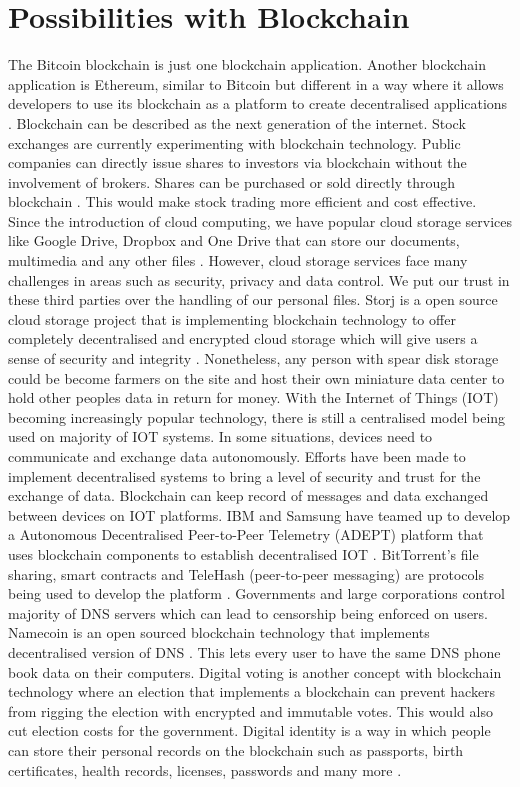 \documentclass[report]{IEEEtran}
\begin{document}
\section{Possibilities with Blockchain}
The Bitcoin blockchain is just one blockchain application. Another blockchain application is Ethereum, similar to Bitcoin but different in a way where it allows developers to use its blockchain as a platform to create decentralised applications \cite{survey}. Blockchain can be described as the next generation of the internet. Stock exchanges are currently experimenting with blockchain technology. Public companies can directly issue shares to investors via blockchain without the involvement of brokers. Shares can be purchased or sold directly through blockchain \cite{air}. This would make stock trading more efficient and cost effective. Since the introduction of cloud computing, we have popular cloud storage services like Google Drive, Dropbox and One Drive that can store our documents, multimedia and any other files \cite{air}. However, cloud storage services face many challenges in areas such as security, privacy and data control. We put our trust in these third parties over the handling of our personal files. Storj is a open source cloud storage project that is implementing blockchain technology to offer completely decentralised and encrypted cloud storage which will give users a sense of security and integrity \cite{air}. Nonetheless, any person with spear disk storage could be become farmers on the site and host their own miniature data center to hold other peoples data in return for money. With the Internet of Things (IOT) becoming increasingly popular technology, there is still a centralised model being used on majority of IOT systems. In some situations, devices need to communicate and exchange data autonomously. Efforts have been made to implement decentralised systems to bring a level of security and trust for the exchange of data. Blockchain can keep record of messages and data exchanged between devices on IOT platforms. IBM and Samsung have teamed up to develop a Autonomous Decentralised Peer-to-Peer Telemetry (ADEPT) platform that uses blockchain components to establish decentralised IOT \cite{air}. BitTorrent's file sharing, smart contracts and TeleHash (peer-to-peer messaging) are protocols being used to develop the platform \cite{air}. Governments and large corporations control majority of DNS servers which can lead to censorship being enforced on users. Namecoin is an open sourced blockchain technology that implements decentralised version of DNS \cite{air}. This lets every user to have the same DNS phone book data on their computers. Digital voting is another concept with blockchain technology where an election that implements a blockchain can prevent hackers from rigging the election with encrypted and immutable votes. This would also cut election costs for the government. Digital identity is a way in which people can store their personal records on the blockchain such as passports, birth certificates, health records, licenses, passwords and many more \cite{double}.
\end{document}
